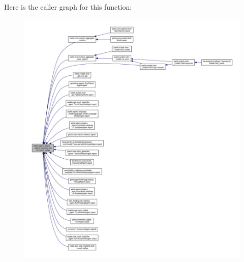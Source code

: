 Here is the caller graph for this function\+:
\nopagebreak
\begin{figure}[H]
\begin{center}
\leavevmode
\includegraphics[width=350pt]{namespaceparlai_1_1agents_1_1legacy__agents_1_1seq2seq_1_1utils__v0_af377ec61bfc0423461e7b409ffc883b9_icgraph}
\end{center}
\end{figure}
